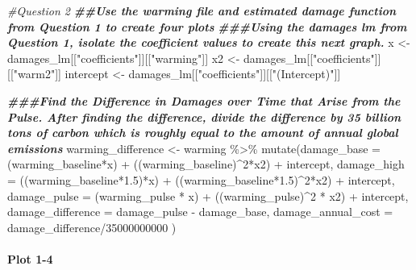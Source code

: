 \documentclass[
]{article}
\newenvironment{Shaded}{\begin{snugshade}}{\end{snugshade}}
\newcommand{\AttributeTok}[1]{\textcolor[rgb]{0.77,0.63,0.00}{#1}}
\newcommand{\CommentTok}[1]{\textcolor[rgb]{0.56,0.35,0.01}{\textit{#1}}}
\newcommand{\DecValTok}[1]{\textcolor[rgb]{0.00,0.00,0.81}{#1}}
\newcommand{\DocumentationTok}[1]{\textcolor[rgb]{0.56,0.35,0.01}{\textbf{\textit{#1}}}}
\newcommand{\FloatTok}[1]{\textcolor[rgb]{0.00,0.00,0.81}{#1}}
\newcommand{\FunctionTok}[1]{\textcolor[rgb]{0.00,0.00,0.00}{#1}}
\newcommand{\NormalTok}[1]{#1}
\newcommand{\OtherTok}[1]{\textcolor[rgb]{0.56,0.35,0.01}{#1}}
\newcommand{\SpecialCharTok}[1]{\textcolor[rgb]{0.00,0.00,0.00}{#1}}
\newcommand{\StringTok}[1]{\textcolor[rgb]{0.31,0.60,0.02}{#1}}
\begin{document}
\begin{Shaded}
\begin{Highlighting}[]
\CommentTok{\#Question 2}
\DocumentationTok{\#\#Use the warming file and estimated damage function from Question 1 to create four plots}
\DocumentationTok{\#\#\#Using the damages lm from Question 1, isolate the coefficient values to create this next graph.}
\NormalTok{x }\OtherTok{\textless{}{-}}\NormalTok{ damages\_lm[[}\StringTok{"coefficients"}\NormalTok{]][[}\StringTok{"warming"}\NormalTok{]]}
\NormalTok{x2 }\OtherTok{\textless{}{-}}\NormalTok{ damages\_lm[[}\StringTok{"coefficients"}\NormalTok{]][[}\StringTok{"warm2"}\NormalTok{]]}
\NormalTok{intercept }\OtherTok{\textless{}{-}}\NormalTok{ damages\_lm[[}\StringTok{"coefficients"}\NormalTok{]][[}\StringTok{"(Intercept)"}\NormalTok{]]}

\DocumentationTok{\#\#\#Find the Difference in Damages over Time that Arise from the Pulse. After finding the difference, divide the difference by 35 billion tons of carbon which is roughly equal to the amount of annual global emissions}
\NormalTok{warming\_difference }\OtherTok{\textless{}{-}}\NormalTok{ warming }\SpecialCharTok{\%\textgreater{}\%}
  \FunctionTok{mutate}\NormalTok{(}\AttributeTok{damage\_base =}\NormalTok{ (warming\_baseline}\SpecialCharTok{*}\NormalTok{x) }\SpecialCharTok{+}\NormalTok{ ((warming\_baseline)}\SpecialCharTok{\^{}}\DecValTok{2}\SpecialCharTok{*}\NormalTok{x2) }\SpecialCharTok{+}\NormalTok{ intercept,}
         \AttributeTok{damage\_high =}\NormalTok{ ((warming\_baseline}\SpecialCharTok{*}\FloatTok{1.5}\NormalTok{)}\SpecialCharTok{*}\NormalTok{x) }\SpecialCharTok{+}\NormalTok{ ((warming\_baseline}\SpecialCharTok{*}\FloatTok{1.5}\NormalTok{)}\SpecialCharTok{\^{}}\DecValTok{2}\SpecialCharTok{*}\NormalTok{x2) }\SpecialCharTok{+}\NormalTok{ intercept,}
         \AttributeTok{damage\_pulse =}\NormalTok{ (warming\_pulse }\SpecialCharTok{*}\NormalTok{ x) }\SpecialCharTok{+}\NormalTok{ ((warming\_pulse)}\SpecialCharTok{\^{}}\DecValTok{2} \SpecialCharTok{*}\NormalTok{ x2) }\SpecialCharTok{+}\NormalTok{ intercept,}
         \AttributeTok{damage\_difference =}\NormalTok{ damage\_pulse }\SpecialCharTok{{-}}\NormalTok{ damage\_base,}
         \AttributeTok{damage\_annual\_cost =}\NormalTok{ damage\_difference}\SpecialCharTok{/}\DecValTok{35000000000}
\NormalTok{         )}
\end{Highlighting}
\end{Shaded}

\hypertarget{plot-1-4}{%
\paragraph{Plot 1-4}\label{plot-1-4}}
\end{document}
